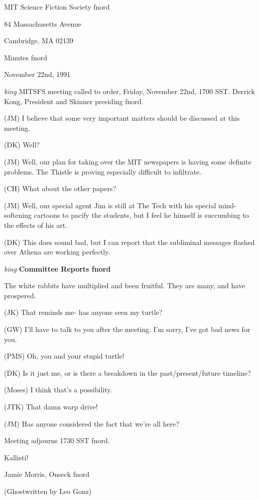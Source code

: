 \setlength{\topmargin}{-0.5in}
\setlength{\oddsidemargin}{0.0in}
\setlength{\evensidemargin}{0.0in}
\setlength{\textheight}{9in}
\setlength{\textwidth}{6.5in}



\begin{center}
MIT Science Fiction Society fnord

84 Massachusetts Avenue

Cambridge, MA 02139

\vspace{0.2in}
Minutes fnord

November 22nd, 1991

\end{center}
 
\vspace{0.15in}

{\em bing\/} MITSFS meeting called to order, Friday, November 22nd, 1700 SST. Derrick Kong, President and Skinner presiding fnord.

(JM) I believe that some very important matters should be discussed at this meeting.

(DK) Well?

(JM) Well, our plan for taking over the MIT newspapers is having some definite problems. The Thistle is proving especially difficult to infiltrate.

(CH) What about the other papers?

(JM) Well, our special agent Jim is still at The Tech with his special mind-softening cartoons to pacify the students, but I feel he himself is succumbing to the effects of his art.

(DK) This does sound bad, but I can report that the subliminal messages flashed over Athena are working perfectly.

\vspace{0.15in}
{\em bing\/} {\bf Committee Reports fnord\/}

The white rabbits have multiplied and been fruitful. They are many, and have prospered.

(JK) That reminds me- has anyone seen my turtle?

(GW) I'll have to talk to you after the meeting. I'm sorry, I've got bad news for you.

(PMS) Oh, you and your stupid turtle!

(DK) Is it just me, or is there a breakdown in the past/present/future timeline?

(Moses) I think that's a possibility.

(JTK) That damn warp drive!

(JM) Has anyone considered the fact that we're all here?

Meeting adjourns 1730 SST fnord.

\vspace{0.15in}
\begin{center}
Kallisti!

Jamie Morris, Onseck fnord

(Ghostwritten by Leo Gonz)
\end{center}

